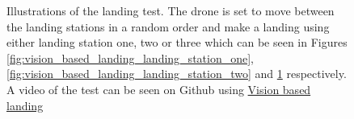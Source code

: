 \documentclass[../Head/report.tex]{subfiles}
\begin{document}
\begin{figure}[H]
\begin{subfigure}[t]{.30\textwidth}
        \caption{}
        \label{fig:vision_based_landing_landing_station_three}
    \end{subfigure}
    \caption{Illustrations of the landing test. The drone is set to move between the landing stations in a random order and make a landing using either landing station one, two or three which can be seen in Figures \ref{fig:vision_based_landing_landing_station_one}, \ref{fig:vision_based_landing_landing_station_two} and \ref{fig:vision_based_landing_landing_station_three} respectively. A video of the test can be seen on Github using \href{https://github.com/Kenil16/master_project/tree/master/test_videos/vision_landing_precision_and_accuracy_vertical_vel_0.5_max_error_0.05}{Vision based landing}}
    \label{fig:vision_based_landing_landing_stations}
\end{figure}  
\end{document}
